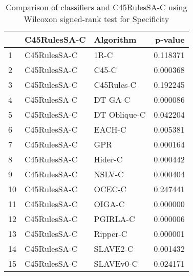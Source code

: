 \begin{table}
\footnotesize
\caption{Comparison of classifiers and C45RulesSA-C using Wilcoxon signed-rank test for Specificity}
\label{tab:C45RulesSA-C wilcoxon Specificity comparison}
\begin{tabular}{lllr}
\hline
 & C45RulesSA-C & Algorithm & p-value \\
\hline
1 & C45RulesSA-C & 1R-C & 0.118371 \\
2 & C45RulesSA-C & C45-C & 0.000368 \\
3 & C45RulesSA-C & C45Rules-C & 0.192245 \\
4 & C45RulesSA-C & DT GA-C & 0.000086 \\
5 & C45RulesSA-C & DT Oblique-C & 0.042204 \\
6 & C45RulesSA-C & EACH-C & 0.005381 \\
7 & C45RulesSA-C & GPR & 0.000164 \\
8 & C45RulesSA-C & Hider-C & 0.000442 \\
9 & C45RulesSA-C & NSLV-C & 0.000404 \\
10 & C45RulesSA-C & OCEC-C & 0.247441 \\
11 & C45RulesSA-C & OIGA-C & 0.000000 \\
12 & C45RulesSA-C & PGIRLA-C & 0.000006 \\
13 & C45RulesSA-C & Ripper-C & 0.000001 \\
14 & C45RulesSA-C & SLAVE2-C & 0.001432 \\
15 & C45RulesSA-C & SLAVEv0-C & 0.024171 \\
\hline
\end{tabular}
\end{table}
